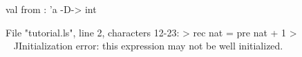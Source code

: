 \runverbatimfalse
{}
\begin{RunVerbatimMsg}
val from : 'a -D-> int
\end{RunVerbatimMsg}
\begin{RunVerbatimErr}
File "tutorial.ls", line 2, characters 12-23:
>  rec nat = pre nat + 1
>            ^^^^^^^^^^^
Initialization error: this expression may not be well initialized.
\end{RunVerbatimErr}
